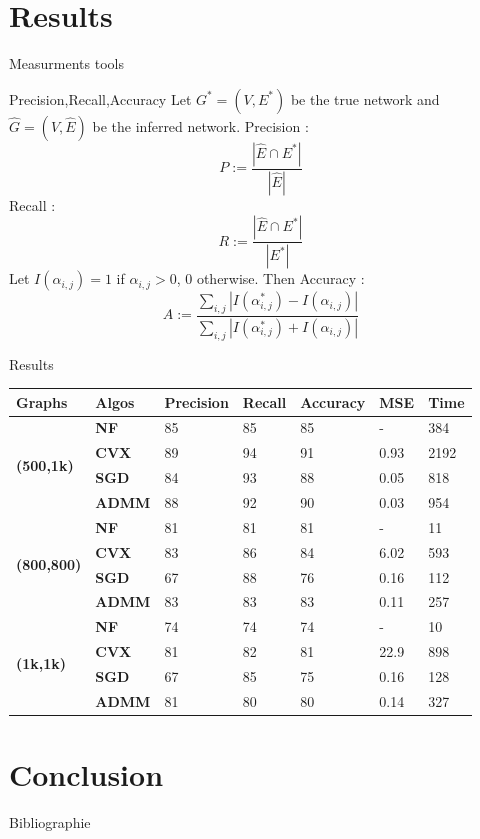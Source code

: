 \documentclass{beamer}
\begin{document}
\section{Results}
\begin{frame}{Measurments tools}
    \begin{block}{Precision,Recall,Accuracy}
    Let $G^*=(V,E^*)$ be the true network and $\hat{G} = (V, \hat{E})$ be the inferred network.
    Precision : \begin{equation*}
        P := \frac{|\hat{E}\cap E^*|}{|\hat{E}|}
    \end{equation*}
    Recall :\begin{equation*}
        R := \frac{|\hat{E} \cap E^*|}{|E^*|}
    \end{equation*}
    Let $I(\alpha_{i,j}) = 1$ if $\alpha_{i,j} > 0$, 0 otherwise. Then 
    Accuracy : \begin{equation*}
        A := \frac{\sum_{i,j}|I(\alpha^*_{i,j})-I(\hat{\alpha}_{i,j})|}{\sum_{i,j}|I(\alpha^*_{i,j})+I(\hat{\alpha}_{i,j})|}
    \end{equation*}
    \end{block}
\end{frame}
\begin{frame}{Results}
\begin{table}[scale = 0.5]
\begin{tabular}{|l|l|l|l|l|l|l|}
\hline
\textbf{Graphs} & \textbf{Algos} & \textbf{Precision} & \textbf{Recall} & \textbf{Accuracy} & \textbf{MSE} & \textbf{Time} \\ \hline
\multirow{4}{*}{\textbf{(500,1k)}} & \textbf{NF} & 85 & 85 & 85 & - & 384 \\ \cline{2-7} 
 & \textbf{CVX} & 89 & 94 & 91 & 0.93 & 2192 \\ \cline{2-7} 
 & \textbf{SGD} & 84 & 93 & 88 & 0.05 & 818 \\ \cline{2-7} 
 & \textbf{ADMM} & 88 & 92 & 90 & 0.03 & 954 \\ \hline
\multirow{4}{*}{\textbf{(800,800)}} & \textbf{NF} & 81 & 81 & 81 & - & 11 \\ \cline{2-7} 
 & \textbf{CVX} & 83 & 86 & 84 & 6.02 & 593 \\ \cline{2-7} 
 & \textbf{SGD} & 67 & 88 & 76 & 0.16 & 112 \\ \cline{2-7} 
 & \textbf{ADMM} & 83 & 83 & 83 & 0.11 & 257 \\ \hline
\multirow{4}{*}{\textbf{(1k,1k)}} & \textbf{NF} & 74 & 74 & 74 & - & 10 \\ \cline{2-7} 
 & \textbf{CVX} & 81 & 82 & 81 & 22.9 & 898 \\ \cline{2-7} 
 & \textbf{SGD} & 67 & 85 & 75 & 0.16 & 128 \\ \cline{2-7} 
 & \textbf{ADMM} & 81 & 80 & 80 & 0.14 & 327 \\ \hline
\end{tabular}
\end{table}
\end{frame}
\section{Conclusion}
\begin{frame}{Bibliographie}
    
    
\end{frame}
\end{document}
